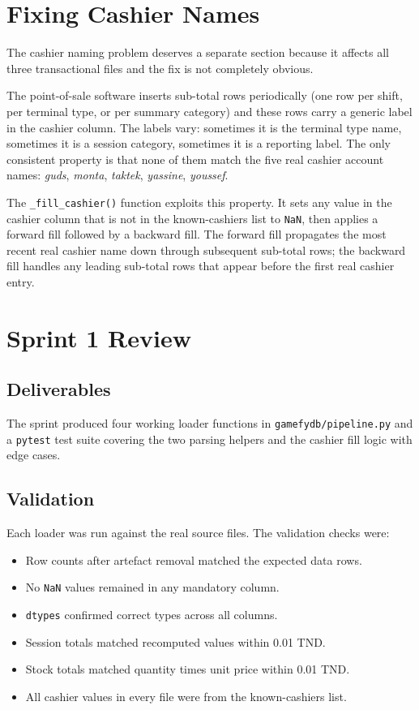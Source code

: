 \documentclass[12pt, a4paper]{report}
\begin{document}
\section{Fixing Cashier Names}

The cashier naming problem deserves a separate section because it affects all three
transactional files and the fix is not completely obvious.

The point-of-sale software inserts sub-total rows periodically (one row per shift,
per terminal type, or per summary category) and these rows carry a generic label
in the cashier column. The labels vary: sometimes it is the terminal type name,
sometimes it is a session category, sometimes it is a reporting label. The only
consistent property is that none of them match the five real cashier account names:
\textit{guds}, \textit{monta}, \textit{taktek}, \textit{yassine}, \textit{youssef}.

The \texttt{\_fill\_cashier()} function exploits this property. It sets any value
in the cashier column that is not in the known-cashiers list to \texttt{NaN},
then applies a forward fill followed by a backward fill. The forward fill
propagates the most recent real cashier name down through subsequent sub-total
rows; the backward fill handles any leading sub-total rows that appear before
the first real cashier entry.

\section{Sprint 1 Review}

\subsection{Deliverables}

The sprint produced four working loader functions in \texttt{gamefydb/pipeline.py}
and a \texttt{pytest} test suite covering the two parsing helpers and the cashier
fill logic with edge cases.

\subsection{Validation}

Each loader was run against the real source files. The validation checks were:

\begin{itemize}[noitemsep]
  \item Row counts after artefact removal matched the expected data rows.
  \item No \texttt{NaN} values remained in any mandatory column.
  \item \texttt{dtypes} confirmed correct types across all columns.
  \item Session totals matched recomputed values within 0.01 TND.
  \item Stock totals matched quantity times unit price within 0.01 TND.
  \item All cashier values in every file were from the known-cashiers list.
\end{itemize}
\end{document}
